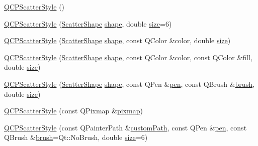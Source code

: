 \begin{DoxyCompactItemize}
\item 
\hyperlink{class_q_c_p_scatter_style_a8836018d9ad83ccd8870de8315c1be73}{Q\-C\-P\-Scatter\-Style} ()
\item 
\hyperlink{class_q_c_p_scatter_style_a003d92f74f4561eda111862eadd62f28}{Q\-C\-P\-Scatter\-Style} (\hyperlink{class_q_c_p_scatter_style_adb31525af6b680e6f1b7472e43859349}{Scatter\-Shape} \hyperlink{class_q_c_p_scatter_style_a4462a25ef17769631f4e0aa81dadca4b}{shape}, double \hyperlink{class_q_c_p_scatter_style_a1973ee650368f1c5f55507b78473f634}{size}=6)
\item 
\hyperlink{class_q_c_p_scatter_style_afa059da858c864c7e05871dc602d7eab}{Q\-C\-P\-Scatter\-Style} (\hyperlink{class_q_c_p_scatter_style_adb31525af6b680e6f1b7472e43859349}{Scatter\-Shape} \hyperlink{class_q_c_p_scatter_style_a4462a25ef17769631f4e0aa81dadca4b}{shape}, const Q\-Color \&color, double \hyperlink{class_q_c_p_scatter_style_a1973ee650368f1c5f55507b78473f634}{size})
\item 
\hyperlink{class_q_c_p_scatter_style_a6e1b64f12cac7f07af180ae4316fd38d}{Q\-C\-P\-Scatter\-Style} (\hyperlink{class_q_c_p_scatter_style_adb31525af6b680e6f1b7472e43859349}{Scatter\-Shape} \hyperlink{class_q_c_p_scatter_style_a4462a25ef17769631f4e0aa81dadca4b}{shape}, const Q\-Color \&color, const Q\-Color \&fill, double \hyperlink{class_q_c_p_scatter_style_a1973ee650368f1c5f55507b78473f634}{size})
\item 
\hyperlink{class_q_c_p_scatter_style_a85acc4941d7e5c9bca5fa51377a77f49}{Q\-C\-P\-Scatter\-Style} (\hyperlink{class_q_c_p_scatter_style_adb31525af6b680e6f1b7472e43859349}{Scatter\-Shape} \hyperlink{class_q_c_p_scatter_style_a4462a25ef17769631f4e0aa81dadca4b}{shape}, const Q\-Pen \&\hyperlink{class_q_c_p_scatter_style_a3c24c3bf37b561b4807aed9f1418ab58}{pen}, const Q\-Brush \&\hyperlink{class_q_c_p_scatter_style_a46bf481d84bfa31b287dd43a3bf86d37}{brush}, double \hyperlink{class_q_c_p_scatter_style_a1973ee650368f1c5f55507b78473f634}{size})
\item 
\hyperlink{class_q_c_p_scatter_style_a63962094587a4c2258435aa7933996cc}{Q\-C\-P\-Scatter\-Style} (const Q\-Pixmap \&\hyperlink{class_q_c_p_scatter_style_a9bab44cc41fcd585621a4b3e0e48231b}{pixmap})
\item 
\hyperlink{class_q_c_p_scatter_style_a879c30647683b3cfbde2afecea815e6f}{Q\-C\-P\-Scatter\-Style} (const Q\-Painter\-Path \&\hyperlink{class_q_c_p_scatter_style_a4dd4998dfb0d6889205668a06c790328}{custom\-Path}, const Q\-Pen \&\hyperlink{class_q_c_p_scatter_style_a3c24c3bf37b561b4807aed9f1418ab58}{pen}, const Q\-Brush \&\hyperlink{class_q_c_p_scatter_style_a46bf481d84bfa31b287dd43a3bf86d37}{brush}=Qt\-::\-No\-Brush, double \hyperlink{class_q_c_p_scatter_style_a1973ee650368f1c5f55507b78473f634}{size}=6)

\end{DoxyCompactItemize}
